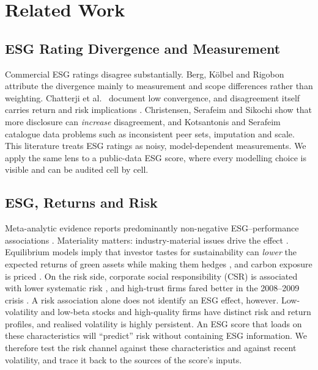 \section{Related Work}
\label{sec:related}

\subsection{ESG Rating Divergence and Measurement}

Commercial ESG ratings disagree substantially. Berg, K\"{o}lbel and Rigobon
\cite{berg_2022} attribute the divergence mainly to measurement and scope
differences rather than weighting. Chatterji et al.\ \cite{chatterji_2016}
document low convergence, and disagreement itself carries return and risk
implications \cite{gibson_2021, avramov_2022}. Christensen, Serafeim and
Sikochi \cite{christensen_2022} show that more disclosure can \emph{increase}
disagreement, and Kotsantonis and Serafeim \cite{kotsantonis_2019} catalogue
data problems such as inconsistent peer sets, imputation and scale. This
literature treats ESG ratings as noisy, model-dependent measurements. We apply
the same lens to a public-data ESG score, where every modelling choice is
visible and can be audited cell by cell.

\subsection{ESG, Returns and Risk}

Meta-analytic evidence reports predominantly non-negative ESG--performance
associations \cite{friede_2015, eccles_2014}. Materiality matters: industry-material
issues drive the effect \cite{khan_2016}. Equilibrium models imply that
investor tastes for sustainability can \emph{lower} the expected returns of
green assets while making them hedges \cite{pastor_2021, pedersen_2021}, and
carbon exposure is priced \cite{bolton_2021}. On the risk side, corporate social responsibility (CSR) is
associated with lower
systematic risk \cite{albuquerque_2019}, and high-trust firms fared better in
the 2008--2009 crisis \cite{lins_2017}. A risk association alone does not
identify an ESG effect, however. Low-volatility and low-beta stocks
\cite{ang_2006, frazzini_pedersen_2014} and high-quality firms
\cite{asness_2019} have distinct risk and return profiles, and realised
volatility is highly persistent. An ESG score that loads on these
characteristics will ``predict'' risk without containing ESG information.
We therefore test the risk channel against these characteristics and against
recent volatility, and trace it back to the sources of the score's inputs.

